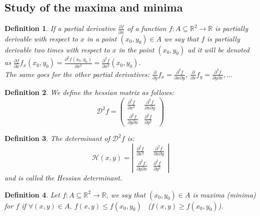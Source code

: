\documentclass{article}
\newtheorem{definition}{Definition}
\begin{document}
    \subsection*{Study of the maxima and minima}
        \begin{definition}
            If a partial derivative $\frac{\partial f}{\partial x}$ of a function $f : A \subseteq \mathbb{R}^2 \rightarrow \mathbb{R}$ is partially derivable with respect to $x$ in a point $(x_0,y_0) \in A$ we say that $f$ is partially derivable two times with respect to $x$ in the point $(x_0,y_0)$ ad it will be denoted as $\frac{\partial f}{\partial x}f_x(x_0,y_0)=\frac{\partial^2 f(x_0,y_0)}{\partial x^2} = \frac{\partial^2 f}{\partial x^2}(x_0,y_0)$. \\
            The same goes for the other partial derivatives: $\frac{\partial}{\partial y}f_x = \frac{\partial^2 f}{\partial x \partial y}$, $\frac{\partial}{\partial x}f_y = \frac{\partial^2 f}{\partial y \partial x}, \ldots $            
        \end{definition}
        \begin{definition}
            We define the hessian matrix as follows:
        \begin{equation*}
            \mathcal{D}^2f = \left(\begin{matrix}
                \frac{\partial^2 f}{\partial x^2} & \frac{\partial ^2 f}{\partial x \partial y} \\ \frac{\partial^2 f}{\partial y \partial x} & \frac{\partial ^2 f}{\partial y^2} 
            \end{matrix} \right)  
        \end{equation*}
        \end{definition}
        \begin{definition}
            The determinant of $\mathcal{D}^2f$ is: 
            \begin{equation*}
                \mathcal{H}(x,y) = \left\lvert \begin{matrix}
                \frac{\partial^2 f}{\partial x^2} & \frac{\partial ^2 f}{\partial x \partial y} \\ \frac{\partial^2 f}{\partial y \partial x} & \frac{\partial ^2 f}{\partial y^2} 
            \end{matrix} \right\rvert 
        \end{equation*} and is called the Hessian determinant.
        \end{definition}
        \begin{definition}
            Let $f : A \subseteq \mathbb{R}^2 \rightarrow \mathbb{R}$, we say that $(x_0,y_0) \in A$ is maxima (minima) for $f$ if $\forall (x,y) \in A, \ f(x,y) \leqslant f(x_0,y_0)$ \ ($f(x,y) \geqslant f(x_0,y_0)$). 
        \end{definition}
\end{document}
